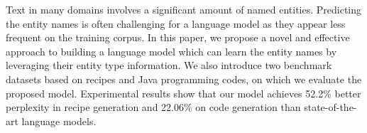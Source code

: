 Text in many domains involves a significant amount of named entities. Predicting the entity names is often challenging for a language model as they appear less frequent on the training corpus. In this paper, we propose a novel and effective approach to building a language model which can learn the entity names by leveraging their entity type information. We also introduce two benchmark datasets based on recipes and Java programming codes, on which we evaluate the proposed model. Experimental results show that our model achieves 52.2\% better perplexity in recipe generation and 22.06\% on code generation than state-of-the-art language models.
